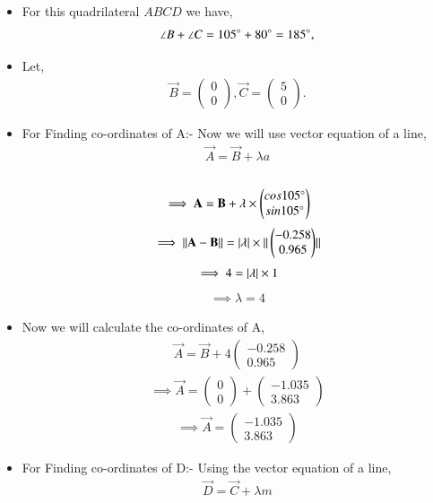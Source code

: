 \documentclass[journal,12pt,twocolumn]{IEEEtran}
\newcommand{\myvec}[1]{\ensuremath{\begin{pmatrix}#1\end{pmatrix}}}
\begin{document}
\begin{itemize}
\item For this quadrilateral $ABCD$ we have,
\begin{align}
\angle B +\angle C = 105\degree + 80\degree =185\degree,
\end{align}
\item Let, \begin{align}
\vec{B}= \myvec{0\\0}, \vec{C}= \myvec{5\\0}.
\end{align}
\item For Finding co-ordinates of A:-
Now we will use vector equation of a line,
\begin{align}
    \vec{A}= \vec{B}+\lambda a
\end{align}
\\
\begin{align}
   \implies \vec{A}= \vec{B}+ \lambda \times \myvec{cos105\degree \\ sin105\degree}
\end{align}
\begin{align}
    \implies {\norm{\vec{A}-\vec{B}}}= \abs{\lambda} \times{\norm{\myvec{-0.258\\0.965}}}
\end{align}
\begin{align}
   \implies 4= \vert\lambda\vert \times 1
\end{align}
\begin{align}
    \implies \lambda = 4
\end{align}
\item Now we will calculate the co-ordinates of A,
\begin{align}
 \vec{A}= \vec{B}+ 4\myvec{-0.258\\0.965}
 \end{align}
 \begin{align}
     \implies \vec{A}= \myvec{0\\0}+\myvec{-1.035\\3.863}
 \end{align}
 \begin{align}
    \implies  \vec{A}= \myvec{-1.035\\3.863}
 \end{align}
\item For Finding co-ordinates of D:- 
  Using the vector equation of a line, 
 \begin{align}
     \vec{D}= \vec{C}+ \lambda m
 \end{align}

\end{itemize}
\end{document}
